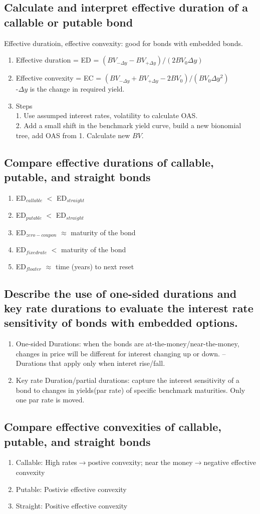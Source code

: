 \documentclass{article}
\newcommand{\be}{\begin{enumerate}}
\newcommand{\ee}{\end{enumerate}}
\newcommand{\ra}{$\rightarrow$}
\begin{document}
\subsection{Calculate and interpret effective duration of a callable or putable bond}
Effective duratioin, effective convexity: good for bonds with embedded bonds.
\be
    \item Effective duration = ED = $ (BV_{-\Delta y}-BV_{+\Delta y})/(2BV_0\Delta y) $
    \item Effective convexity = EC = $ (BV_{-\Delta y}+BV_{+\Delta y}-2BV_0)/(BV_0\Delta y^2) $
        \\-$\Delta y$ is the change in required yield.
    \item Steps
        \\1. Use assumped interest rates, volatility to calculate OAS.
        \\2. Add a small shift in the benchmark yield curve, build a new bionomial
        tree, add OAS from 1. Calculate new $BV$.
\ee
\subsection{Compare effective durations of callable, putable, and straight bonds}
\be
    \item ED$_{callable}$ $<$ ED$_{straight}$
    \item ED$_{putable}$ $<$ ED$_{straight}$
    \item ED$_{zero-coupon}$ $\approx$ maturity of the bond
    \item ED$_{fixed rate}$ $<$ maturity of the bond
    \item ED$_{floater}$ $\approx$ time (years) to next reset
\ee
\subsection{Describe the use of one-sided durations and key rate durations to 
evaluate the interest rate sensitivity of bonds with embedded options.}
\be
    \item One-sided Durations: when the bonds are at-the-money/near-the-money, changes in price
will be different for interest changing up or down. -- Durations that apply only when interet rise/fall.
    \item Key rate Duration/partial durations: capture the interest sensitivity of a bond
    to changes in yields(par rate) of specific benchmark maturities. Only one par rate is moved.
\ee
\subsection{Compare effective convexities of callable, putable, and straight bonds}
\be
    \item Callable: High rates\ra postive convexity; near the money\ra negative effective convexity
    \item Putable: Postivie effective convexity
    \item Straight: Positive effective convexity
\ee
\end{document}
